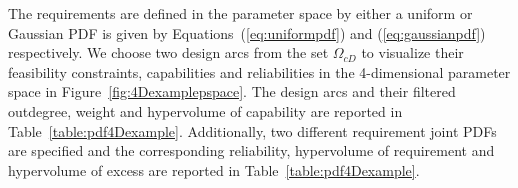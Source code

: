 The requirements are defined in the parameter space by either a uniform or Gaussian \ac{PDF} is given by Equations~(\ref{eq:uniformpdf}) and (\ref{eq:gaussianpdf}) respectively. We choose two design arcs from the set $\Omega_{cD}$ to visualize their feasibility constraints, capabilities and reliabilities in the 4-dimensional parameter space in Figure~\ref{fig:4Dexamplepspace}. The design arcs and their filtered outdegree, weight and hypervolume of capability are reported in Table~\ref{table:pdf4Dexample}. Additionally, two different requirement joint \acp{PDF} are specified and the corresponding reliability, hypervolume of requirement and hypervolume of excess are reported in Table~\ref{table:pdf4Dexample}.

\newcommand{\cwaa}{0.75cm} %
\newcommand{\cwa}{1.5cm} %
\newcommand{\cwc}{1.5cm} %
\newcommand{\cwd}{1cm} %
\newcommand{\cwe}{1.5cm} %
\newcommand{\cwf}{1.5cm} %
%
%
\newcommand{\cwb}{1.1cm} %
\newcommand{\cwi}{1.1cm} %
\newcommand{\cwj}{1.1cm} %

